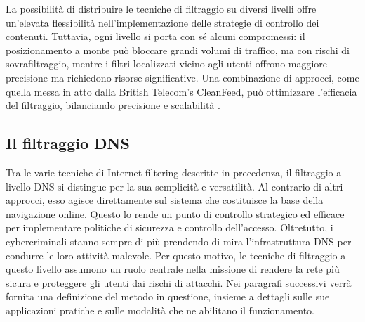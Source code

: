 La possibilità di distribuire le tecniche di filtraggio su diversi livelli offre un'elevata flessibilità nell'implementazione delle strategie di controllo dei contenuti. Tuttavia, ogni livello si porta con sé alcuni compromessi: il posizionamento a monte può bloccare grandi volumi di traffico, ma con rischi di sovrafiltraggio, mentre i filtri localizzati vicino agli utenti offrono maggiore precisione ma richiedono risorse significative. Una combinazione di approcci, come quella messa in atto dalla British Telecom’s CleanFeed, può ottimizzare l'efficacia del filtraggio, bilanciando precisione e scalabilità \cite{DBLP:journals/ieeesp/Varadharajan10}.

\subsection{Il filtraggio DNS}
Tra le varie tecniche di Internet filtering descritte in precedenza, il filtraggio a livello DNS si distingue per la sua semplicità e versatilità. Al contrario di altri approcci, esso agisce direttamente sul sistema che costituisce la base della navigazione online. Questo lo rende un punto di controllo strategico ed efficace per implementare politiche di sicurezza e controllo dell'accesso. Oltretutto, i cybercriminali stanno sempre di più prendendo di mira l'infrastruttura DNS per condurre le loro attività malevole. Per questo motivo, le tecniche di filtraggio a questo livello assumono un ruolo centrale nella missione di rendere la rete più sicura e proteggere gli utenti dai rischi di attacchi. Nei paragrafi successivi verrà fornita una definizione del metodo in questione, insieme a dettagli sulle sue applicazioni pratiche e sulle modalità che ne abilitano il funzionamento.

